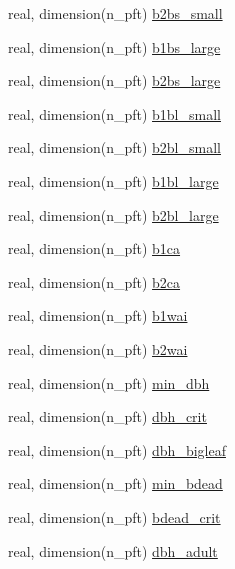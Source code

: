 \begin{DoxyCompactItemize}
\item 
real, dimension(n\+\_\+pft) \hyperlink{namespacepft__coms_a184732d6139803d34ee55b42fb921695}{b2bs\+\_\+small}
\item 
real, dimension(n\+\_\+pft) \hyperlink{namespacepft__coms_a5a61d97876e834a3e2618c85a2310bba}{b1bs\+\_\+large}
\item 
real, dimension(n\+\_\+pft) \hyperlink{namespacepft__coms_aed3d2b057ee3fbf66a115868344eaa33}{b2bs\+\_\+large}
\item 
real, dimension(n\+\_\+pft) \hyperlink{namespacepft__coms_acec323ee151ee47b0173bc85ef816453}{b1bl\+\_\+small}
\item 
real, dimension(n\+\_\+pft) \hyperlink{namespacepft__coms_ab0d33f3125e1ddd008763f955beceb8d}{b2bl\+\_\+small}
\item 
real, dimension(n\+\_\+pft) \hyperlink{namespacepft__coms_a214f419aed39937155b3b0e22ef55437}{b1bl\+\_\+large}
\item 
real, dimension(n\+\_\+pft) \hyperlink{namespacepft__coms_a3047801affde1c1d10ddb8ceed1e6cb7}{b2bl\+\_\+large}
\item 
real, dimension(n\+\_\+pft) \hyperlink{namespacepft__coms_a56ccfd1fc49345702eb25a9a9f4a5756}{b1ca}
\item 
real, dimension(n\+\_\+pft) \hyperlink{namespacepft__coms_a2380072ccb1b4557283c4f7d44398c9c}{b2ca}
\item 
real, dimension(n\+\_\+pft) \hyperlink{namespacepft__coms_ad8ddc641c836a1062e3157400b675217}{b1wai}
\item 
real, dimension(n\+\_\+pft) \hyperlink{namespacepft__coms_a31ab705538ba69a865a41647d0bd5d63}{b2wai}
\item 
real, dimension(n\+\_\+pft) \hyperlink{namespacepft__coms_a6290d41cd79d6f8ac7819f9bf06cad60}{min\+\_\+dbh}
\item 
real, dimension(n\+\_\+pft) \hyperlink{namespacepft__coms_a39e1c4892ebafc9be2ac78b48d954d5c}{dbh\+\_\+crit}
\item 
real, dimension(n\+\_\+pft) \hyperlink{namespacepft__coms_a86747c6ee955a89a55612d189bf255f8}{dbh\+\_\+bigleaf}
\item 
real, dimension(n\+\_\+pft) \hyperlink{namespacepft__coms_af689fc3f0c233590c72175bf99d1c8f6}{min\+\_\+bdead}
\item 
real, dimension(n\+\_\+pft) \hyperlink{namespacepft__coms_a321291df889682b63b1a09ff1affff18}{bdead\+\_\+crit}
\item 
real, dimension(n\+\_\+pft) \hyperlink{namespacepft__coms_a5dbaccf1767dc343b4dca7f5e25f358b}{dbh\+\_\+adult}

\end{DoxyCompactItemize}
